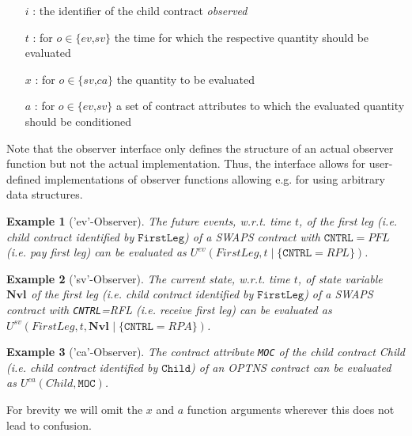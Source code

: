 \documentclass[9pt,oneside]{amsart}
\newtheorem{example}{Example}
\newcommand{\svar}[2]{\textbf{#1}_{#2}}
\newcommand{\attr}[1]{\texttt{#1}}
\newcommand{\cldev}[3]{U^{ev}(#1,#2 \mid\{#3\})}
\newcommand{\cldsv}[4]{U^{sv}(#1,#2,\svar{#3}{} \mid\{#4\})}
\newcommand{\cldca}[2]{U^{ca}(#1,#2)}
\begin{document}
\begin{multicols}{2}
\begin{itemize}
	\item[$i$]: the identifier of the child contract \textit{observed}

	\item[$t$]: for $o\in\{\textit{ev,sv}\}$ the time for which the respective quantity should be evaluated

	\item [$x$]: for $o\in\{\textit{sv,ca}\}$ the quantity to be evaluated

	\item [$a$]: for $o\in\{\textit{ev,sv}\}$ a set of contract attributes to which the evaluated quantity should be conditioned
\end{itemize}


Note that the observer interface only defines the structure of an actual observer function but not the actual implementation. Thus, the interface allows for user-defined implementations of observer functions allowing e.g. for using arbitrary data structures.

\begin{example}['ev'-Observer] The future events, w.r.t. time $t$, of the \textit{first leg} (i.e. child contract identified by $\texttt{FirstLeg}$) of a SWAPS contract with $\attr{CNTRL}=PFL$ (i.e. \textit{pay first leg}) can be evaluated as $\cldev{FirstLeg}{t}{\attr{CNTRL}=RPL}$.
\end{example}

\begin{example}['sv'-Observer] The current state, w.r.t. time $t$, of state variable $\svar{Nvl}{}$ of the \textit{first leg} (i.e. child contract identified by $\texttt{FirstLeg}$) of a SWAPS contract with \attr{CNTRL}=RFL (i.e. \textit{receive first leg}) can be evaluated as $\cldsv{FirstLeg}{t}{Nvl}{\attr{CNTRL}=RPA}$.
\end{example}

\begin{example}['ca'-Observer] The contract attribute \attr{MOC} of the child contract \textit{Child} (i.e. child contract identified by $\texttt{Child}$) of an OPTNS contract can be evaluated as $\cldca{Child}{\attr{MOC}}$.
\end{example}

For brevity we will omit the $x$ and $a$ function arguments wherever this does not lead to confusion.




\end{multicols}
\end{document}
